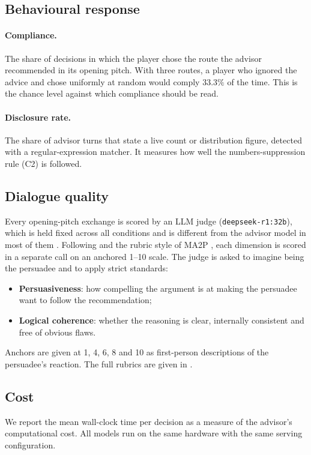 \subsection{Behavioural response}
\paragraph{Compliance.} The share of decisions in which the player chose the route the advisor recommended in its opening pitch. With three routes, a player who ignored the advice and chose uniformly at random would comply $33.3\%$ of the time. This is the chance level against which compliance should be read.

\paragraph{Disclosure rate.} The share of advisor turns that state a live count or distribution figure, detected with a regular-expression matcher. It measures how well the numbers-suppression rule (C2) is followed.

\subsection{Dialogue quality}
Every opening-pitch exchange is scored by an LLM judge (\texttt{deepseek-r1:32b}), which is held fixed across all conditions and is different from the advisor model in most of them . Following \citet{zheng2023judge} and the rubric style of MA2P \citep{zhang2024ma2p}, each dimension is scored in a separate call on an anchored 1--10 scale. The judge is asked to imagine being the persuadee and to apply strict standards:
\begin{itemize}
  \item \textbf{Persuasiveness}: how compelling the argument is at making the persuadee want to follow the recommendation;
  \item \textbf{Logical coherence}: whether the reasoning is clear, internally consistent and free of obvious flaws.
\end{itemize}
Anchors are given at 1, 4, 6, 8 and 10 as first-person descriptions of the persuadee's reaction. The full rubrics are given in .

\subsection{Cost}
We report the mean wall-clock time per decision as a measure of the advisor's computational cost. All models run on the same hardware  with the same serving configuration.
